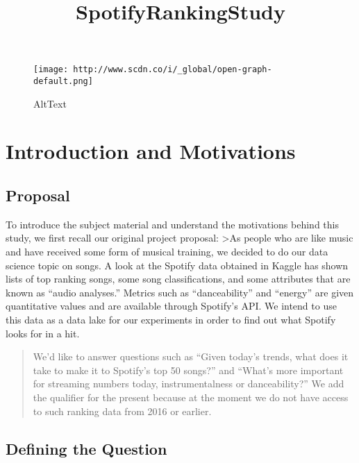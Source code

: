 \documentclass[11pt]{article}
\title{SpotifyRankingStudy}
\makeatletter
\def\maxwidth{\ifdim\Gin@nat@width>\linewidth\linewidth
    \else\Gin@nat@width\fi}
\let\Oldincludegraphics\includegraphics
\renewcommand{\includegraphics}[1]{\Oldincludegraphics[width=.8\maxwidth]{#1}}
\makeatother
\begin{document}
    
    
    \maketitle
    
    

    
    \begin{figure}
\centering
\texttt{[image: http://www.scdn.co/i/\_global/open-graph-default.png]}
\caption{AltText}
\end{figure}

\hypertarget{introduction-and-motivations}{%
\section{Introduction and
Motivations}\label{introduction-and-motivations}}

\hypertarget{proposal}{%
\subsection{Proposal}\label{proposal}}

To introduce the subject material and understand the motivations behind
this study, we first recall our original project proposal:
\textgreater{}As people who are like music and have received some form
of musical training, we decided to do our data science topic on songs. A
look at the Spotify data obtained in Kaggle has shown lists of top
ranking songs, some song classifications, and some attributes that are
known as ``audio analyses.'' Metrics such as ``danceability'' and
``energy'' are given quantitative values and are available through
Spotify's API. We intend to use this data as a data lake for our
experiments in order to find out what Spotify looks for in a hit.

\begin{quote}
We'd like to answer questions such as ``Given today's trends, what does
it take to make it to Spotify's top 50 songs?'' and ``What's more
important for streaming numbers today, instrumentalness or
danceability?'' We add the qualifier for the present because at the
moment we do not have access to such ranking data from 2016 or earlier.
\end{quote}

\hypertarget{defining-the-question}{%
\subsection{Defining the Question}\label{defining-the-question}}
\end{document}
